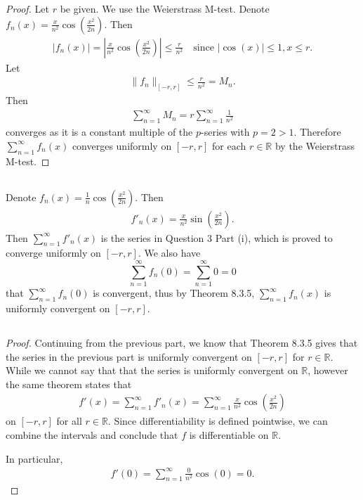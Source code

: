 \documentclass{article}
\theoremstyle{plain}
\newcommand{\R}{\mathbb{R}}
\begin{document}
\section{}
\subsection{}
\begin{proof}
Let $r$ be given. We use the Weierstrass M-test. Denote $f_{n}(x)=\frac{x}{n^{2}}\cos(\frac{x^{2}}{2n})$.
Then
\begin{align*}
|f_{n}(x)|=|\frac{x}{n^{2}}\cos(\frac{x^{2}}{2n})|\le\frac{r}{n^{2}}\quad\text{since
  } |\cos(x)|\le1,x\le r.
\end{align*}
Let \begin{align*}
\|f_{n}\|_{[-r,r]}\le\frac{r}{n^{2}}=M_{n}.
    \end{align*}
Then \begin{align*}
       \sum_{n=1}^{\infty}M_{n}=r\sum_{n=1}^{\infty}\frac{1}{n^{2}}
     \end{align*}
     converges as it is a constant multiple of the $p$-series with $p=2>1$.
     Therefore $\sum_{n=1}^{\infty}f_{n}(x)$ converges uniformly on $[-r,r]$ for
     each $r\in\R$ by the Weierstrass M-test.
\end{proof}
\subsection{}
Denote $f_{n}(x)=\frac{1}{n}\cos(\frac{x^{2}}{2n})$. Then
\begin{align*}
f'_{n}(x)=\frac{x}{n^{2}}\sin(\frac{x^{2}}{2n}).
\end{align*}
Then $\sum_{n=1}^{\infty}f'_{n}(x)$ is the series in Question 3 Part (i), which
is proved to converge uniformly on $[-r,r]$. We also
have \[\sum_{n=1}^{\infty}f_{n}(0)=\sum_{n=1}^{\infty}0=0 \] that
$\sum_{n=1}^{\infty}f_{n}(0)$ is convergent, thus by Theorem 8.3.5,
$\sum_{n=1}^{\infty}f_{n}(x)$ is uniformly convergent on $[-r,r]$.
\subsection{}
\begin{proof}
Continuing from the previous part, we know that Theorem 8.3.5 gives that the
series in the previous part is uniformly convergent on $[-r,r]$ for $r\in\R$.
While we cannot say that that the series is uniformly convergent on $\R$,
however the same theorem states that
\begin{align*}
f'(x)=\sum_{n=1}^{\infty}f'_{n}(x)=\sum_{n=1}^{\infty}\frac{x}{n^{2}}\cos(\frac{x^{2}}{2n})
\end{align*}
on $[-r,r]$ for all $r\in\R$. Since differentiability is defined pointwise, we
can combine the intervals and conclude that $f$ is differentiable on $\R$.\medskip

In particular,
\begin{align*}
f'(0)=\sum_{n=1}^{\infty}\frac{0}{n^{2}}\cos(0)=0.
\end{align*}
\end{proof}
\end{document}
